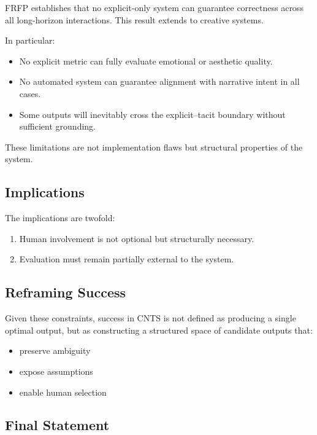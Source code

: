 \documentclass[preprints,article,submit,pdftex,moreauthors,accept]{Definitions/mdpi}
\begin{document}
FRFP establishes that no explicit-only system can guarantee correctness across all long-horizon interactions. This result extends to creative systems.

In particular:

\begin{itemize}
    \item No explicit metric can fully evaluate emotional or aesthetic quality.
    \item No automated system can guarantee alignment with narrative intent in all cases.
    \item Some outputs will inevitably cross the explicit–tacit boundary without sufficient grounding.
\end{itemize}

These limitations are not implementation flaws but structural properties of the system.

\subsection{Implications}

The implications are twofold:

\begin{enumerate}
    \item Human involvement is not optional but structurally necessary.
    \item Evaluation must remain partially external to the system.
\end{enumerate}

\subsection{Reframing Success}

Given these constraints, success in CNTS is not defined as producing a single optimal output, but as constructing a structured space of candidate outputs that:

\begin{itemize}
    \item preserve ambiguity
    \item expose assumptions
    \item enable human selection
\end{itemize}

\subsection{Final Statement}
\end{document}
